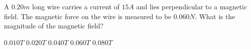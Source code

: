 \begin{questions}\setcounter{question}{29}\question
A $0.20 \unit{m}$ long wire carries a current of $15 \unit{A}$ and lies perpendicular to a magnetic field. The magnetic force on the wire is measured to be $0.060 \unit{N}$. What is the magnitude of the magnetic field?

\begin{oneparchoices}
\choice $0.010 \unit{T}$
\choice $0.020 \unit{T}$
\choice $0.040 \unit{T}$
\choice $0.060 \unit{T}$
\choice $0.080 \unit{T}$
\end{oneparchoices}\end{questions}
